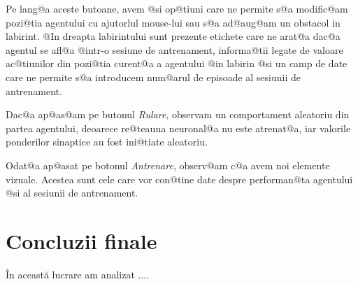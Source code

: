 Pe lang@a aceste butoane, avem @si op@tiuni care ne permite s@a modific@am pozi@tia agentului cu ajutorlul mouse-lui sau s@a ad@aug@am un obstacol in labirint. @In dreapta labirintului sunt prezente etichete care ne arat@a dac@a agentul se afl@a @intr-o sesiune de antrenament, informa@tii legate de valoare ac@tiunilor din pozi@tia curent@a a agentului @in labirin @si un camp de date care ne permite s@a introducem num@arul de episoade al sesiunii de antrenament.

Dac@a ap@as@am pe butonul \textsl{Rulare}, observam un comportament aleatoriu din partea agentului, deoarece re@teauna neuronal@a nu este atrenat@a, iar valorile ponderilor sinaptice au fost ini@tiate aleatoriu.

Odat@a ap@asat pe botonul \textsl{Antrenare}, observ@am c@a avem noi elemente vizuale. Acestea sunt cele care vor con@tine date despre performan@ta agentului @si al sesiunii de antrenament.  


\chapter*{Concluzii finale}



\^ In aceast\u a lucrare am analizat ....
